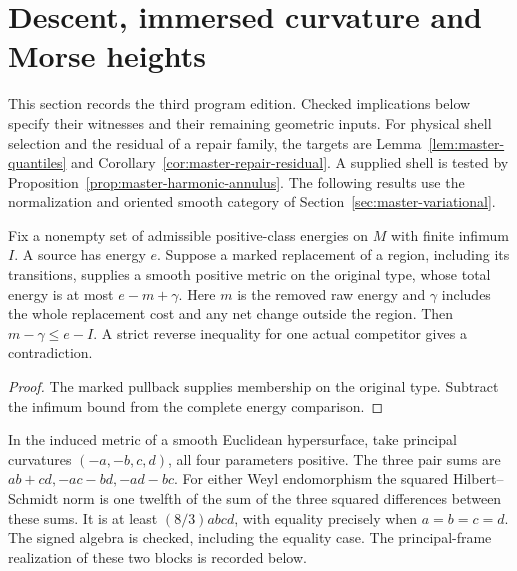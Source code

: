 \section{Descent, immersed curvature and Morse heights}
\label{sec:parallel-investigations}

This section records the third program edition. Checked implications below specify their witnesses and their remaining geometric inputs. For
physical shell selection and the residual of a repair family, the targets
are Lemma~\ref{lem:master-quantiles} and
Corollary~\ref{cor:master-repair-residual}. A supplied shell is tested by
Proposition~\ref{prop:master-harmonic-annulus}. The following results use
the normalization and oriented smooth category of
Section~\ref{sec:master-variational}.

\begin{proposition}
\label{prop:routes-joint-descent}
\leanok
{}
Fix a nonempty set of admissible positive-class energies on \(M\) with
finite infimum \(I\). A source has energy \(e\). Suppose a marked
replacement of a region, including its transitions, supplies a smooth
positive metric on the original type, whose total energy is at most
\(e-m+\gamma\). Here \(m\) is the removed raw energy and \(\gamma\)
includes the whole replacement cost and any net change outside the
region. Then \(m-\gamma\le e-I\). A strict reverse inequality for one
actual competitor gives a contradiction.
\end{proposition}

\begin{proof}
\leanok
The marked pullback supplies membership on the original type. Subtract the
infimum bound from the complete energy comparison.
\end{proof}

\begin{lemma}
\label{lem:routes-middle-weyl}
\leanok
In the induced metric of a smooth Euclidean hypersurface, take principal
curvatures \((-a,-b,c,d)\), all four parameters positive. The three pair
sums are \(ab+cd,-ac-bd,-ad-bc\). For either Weyl endomorphism the squared
Hilbert--Schmidt norm is one twelfth of the sum of the three squared
differences between these sums. It is at least \((8/3)abcd\), with
equality precisely when \(a=b=c=d\). The signed algebra is checked, including the equality case.
The principal-frame realization of these two blocks is recorded below.
\end{lemma}

